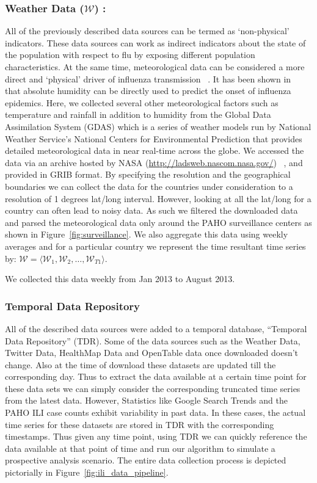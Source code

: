 \subsubsection{Weather Data ($\mathcal{W}$) :}
All of the previously described data sources can
be termed as `non-physical' indicators. These data sources can work as indirect
indicators about the state of the population with respect to flu by exposing
different population characteristics. At the same time, meteorological data can
be considered a more direct and `physical' driver of influenza transmission
~\cite{flu_humidity_physical}. It has been shown
in~\cite{Shaman_orig_humidity_link, Shaman_humidity_USA, ref9}
that absolute humidity can be directly used to predict the onset of influenza
epidemics. Here, we collected several other meteorological factors such as
temperature and rainfall in addition to humidity from the Global Data
Assimilation System (GDAS) which is a series of weather models run by National
Weather Service's National Centers for Environmental Prediction that provides
detailed meteorological data in near real-time across the globe.  We accessed
the data via an archive hosted by NASA (\url{http://ladsweb.nascom.nasa.gov/})
~\cite{HD:2013}, and provided in GRIB format. By specifying the resolution and
the geographical boundaries we can collect the data for the countries under
consideration to a resolution of 1 degrees lat/long interval. However, looking
at all the lat/long for a country can often lead to noisy data. As such we
filtered the downloaded data and parsed the meteorological data only around the
PAHO surveillance centers as shown in Figure~\ref{fig:surveillance}. We also
aggregate this data using weekly averages and for a particular country we
represent the time resultant time series by: 
$\mathcal{W} = \langle \mathcal{W}_1, \mathcal{W}_2, \dots, \mathcal{W}_{T1} \rangle$.

We collected this data weekly from Jan 2013 to August 2013. 


\subsubsection{Temporal Data Repository}
All of the described data sources were
added to a temporal database, ``Temporal Data Repository'' (TDR). Some of the
data sources such as the Weather Data, Twitter Data, HealthMap Data and
OpenTable data once downloaded doesn't change. Also at the time of download
these datasets are updated till the corresponding day.  Thus to extract the
data available at a certain time point for these data sets we can simply
consider the corresponding truncated time series from the latest data. However,
Statistics like Google Search Trends and the PAHO ILI case counts exhibit
variability in past data. In these cases, the actual time series for these datasets are
stored in TDR with the corresponding timestamps. Thus given any time point,
using TDR we can quickly reference the data available at that point of time and
run our algorithm to simulate a prospective analysis scenario.  The entire data
collection process is depicted pictorially in
Figure~\ref{fig:ili_data_pipeline}.



